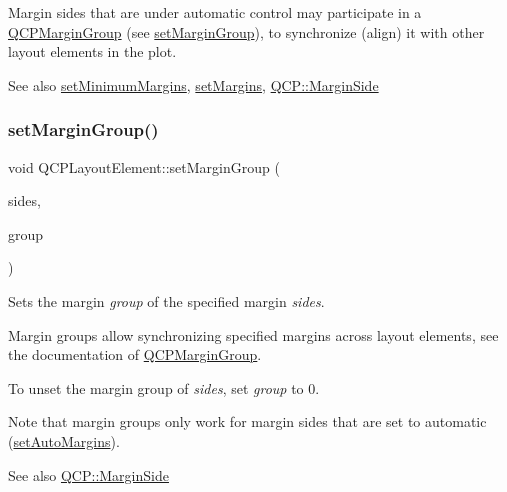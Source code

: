 Margin sides that are under automatic control may participate in a \hyperlink{class_q_c_p_margin_group}{Q\+C\+P\+Margin\+Group} (see \hyperlink{class_q_c_p_layout_element_a516e56f76b6bc100e8e71d329866847d}{set\+Margin\+Group}), to synchronize (align) it with other layout elements in the plot.

\begin{DoxySeeAlso}{See also}
\hyperlink{class_q_c_p_layout_element_a0a8a17abc16b7923159fcc7608f94673}{set\+Minimum\+Margins}, \hyperlink{class_q_c_p_layout_element_a8f450b1f3f992ad576fce2c63d8b79cf}{set\+Margins}, \hyperlink{namespace_q_c_p_a7e487e3e2ccb62ab7771065bab7cae54}{Q\+C\+P\+::\+Margin\+Side} 
\end{DoxySeeAlso}
\mbox{\label{class_q_c_p_layout_element_a516e56f76b6bc100e8e71d329866847d}} 
\subsubsection{\texorpdfstring{set\+Margin\+Group()}{setMarginGroup()}}
{\footnotesize\ttfamily void Q\+C\+P\+Layout\+Element\+::set\+Margin\+Group (\begin{DoxyParamCaption}\item[{Q\+C\+P\+::\+Margin\+Sides}]{sides,  }\item[{\hyperlink{class_q_c_p_margin_group}{Q\+C\+P\+Margin\+Group} $\ast$}]{group }\end{DoxyParamCaption})}

Sets the margin {\itshape group} of the specified margin {\itshape sides}.

Margin groups allow synchronizing specified margins across layout elements, see the documentation of \hyperlink{class_q_c_p_margin_group}{Q\+C\+P\+Margin\+Group}.

To unset the margin group of {\itshape sides}, set {\itshape group} to 0.

Note that margin groups only work for margin sides that are set to automatic (\hyperlink{class_q_c_p_layout_element_accfda49994e3e6d51ed14504abf9d27d}{set\+Auto\+Margins}).

\begin{DoxySeeAlso}{See also}
\hyperlink{namespace_q_c_p_a7e487e3e2ccb62ab7771065bab7cae54}{Q\+C\+P\+::\+Margin\+Side} 
\end{DoxySeeAlso}
\mbox{\label{class_q_c_p_layout_element_a8f450b1f3f992ad576fce2c63d8b79cf}} 
